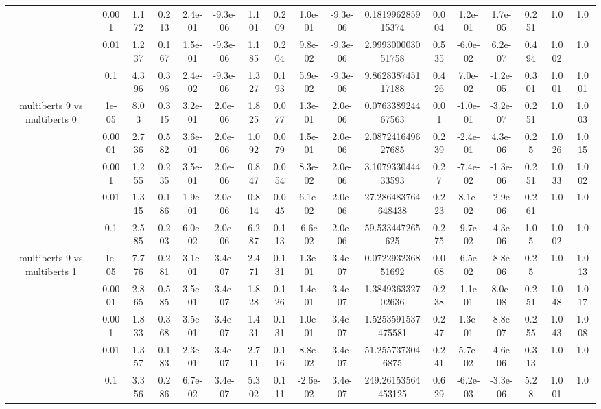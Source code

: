 \begin{tabular}{|c|c|c|c|c|c|c|c|c|c|c|c|c|c|c|c|c|}
 & 0.001 & 1.172 & 0.213 & 2.4e-01 & -9.3e-06 & 1.101 & 0.209 & 1.0e-01 & -9.3e-06 & 0.181996285915374 & 0.004 & 1.2e-01 & 1.7e-05 & 0.251 & 1.0 & 1.0 \\
 & 0.01 & 1.237 & 0.167 & 1.5e-01 & -9.3e-06 & 1.185 & 0.204 & 9.8e-02 & -9.3e-06 & 2.999300003051758 & 0.535 & -6.0e-02 & 6.2e-07 & 0.494 & 1.002 & 1.0 \\
 & 0.1 & 4.396 & 0.396 & 2.4e-02 & -9.3e-06 & 1.327 & 0.193 & 5.9e-02 & -9.3e-06 & 9.862838745117188 & 0.426 & 7.0e-02 & -1.2e-05 & 0.301 & 1.001 & 1.001 \\
\hline
\multirow{5}{*}{multiberts 9 vs multiberts 0} & 1e-05 & 8.03 & 0.315 & 3.2e-01 & 2.0e-06 & 1.825 & 0.077 & 1.3e-01 & 2.0e-06 & 0.076338924467563 & 0.01 & -1.0e-01 & -3.2e-07 & 0.251 & 1.0 & 1.003 \\
 & 0.0001 & 2.736 & 0.582 & 3.6e-01 & 2.0e-06 & 1.092 & 0.079 & 1.5e-01 & 2.0e-06 & 2.087241649627685 & 0.239 & -2.4e-01 & 4.3e-06 & 0.25 & 1.026 & 1.015 \\
 & 0.001 & 1.255 & 0.235 & 3.5e-01 & 2.0e-06 & 0.847 & 0.054 & 8.3e-02 & 2.0e-06 & 3.107933044433593 & 0.27 & -7.4e-02 & -1.3e-06 & 0.251 & 1.033 & 1.002 \\
 & 0.01 & 1.315 & 0.186 & 1.9e-01 & 2.0e-06 & 0.814 & 0.045 & 6.1e-02 & 2.0e-06 & 27.286483764648438 & 0.223 & 8.1e-02 & -2.9e-06 & 0.261 & 1.0 & 1.0 \\
 & 0.1 & 2.585 & 0.203 & 6.0e-02 & 2.0e-06 & 6.287 & 0.113 & -6.6e-02 & 2.0e-06 & 59.533447265625 & 0.275 & -9.7e-02 & -4.3e-06 & 1.05 & 1.002 & 1.0 \\
\hline
\multirow{5}{*}{multiberts 9 vs multiberts 1} & 1e-05 & 7.776 & 0.281 & 3.1e-01 & 3.4e-07 & 2.471 & 0.131 & 1.3e-01 & 3.4e-07 & 0.072293236851692 & 0.008 & -6.5e-02 & -8.8e-06 & 0.25 & 1.0 & 1.013 \\
 & 0.0001 & 2.865 & 0.585 & 3.5e-01 & 3.4e-07 & 1.828 & 0.126 & 1.4e-01 & 3.4e-07 & 1.384936332702636 & 0.238 & -1.1e-01 & 8.0e-08 & 0.251 & 1.048 & 1.017 \\
 & 0.001 & 1.833 & 0.368 & 3.5e-01 & 3.4e-07 & 1.431 & 0.131 & 1.0e-01 & 3.4e-07 & 1.5253591537475581 & 0.247 & 1.3e-01 & -8.8e-07 & 0.255 & 1.043 & 1.008 \\
 & 0.01 & 1.357 & 0.183 & 2.3e-01 & 3.4e-07 & 2.711 & 0.116 & 8.8e-02 & 3.4e-07 & 51.2557373046875 & 0.241 & 5.7e-02 & -4.6e-06 & 0.313 & 1.0 & 1.0 \\
 & 0.1 & 3.356 & 0.286 & 6.7e-02 & 3.4e-07 & 5.302 & 0.111 & -2.6e-02 & 3.4e-07 & 249.26153564453125 & 0.629 & -6.2e-03 & -3.3e-06 & 5.28 & 1.001 & 1.0 \\

\end{tabular}
